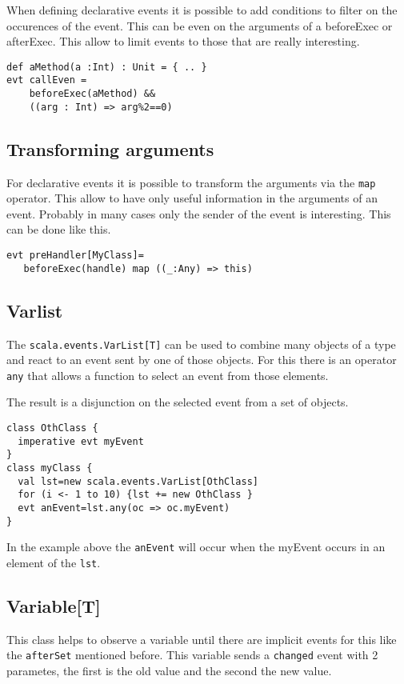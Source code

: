 \documentclass{article}
\begin{document}
When defining declarative events it is possible to add conditions
to filter on the occurences of the event. This can be even on the 
arguments of a beforeExec or afterExec. This allow to limit events 
to those that are really interesting.

\begin{lstlisting}
def aMethod(a :Int) : Unit = { .. }
evt callEven = 
    beforeExec(aMethod) && 
    ((arg : Int) => arg%2==0)
\end{lstlisting}

\subsection{Transforming arguments}
For declarative events it is possible to transform the arguments
via the {\tt map} operator. This allow to have only useful information
in the arguments of an event. Probably in many cases only the sender of
the event is interesting. This can be done like this.

\begin{lstlisting}
evt preHandler[MyClass]=
   beforeExec(handle) map ((_:Any) => this)
\end{lstlisting}

\subsection{Varlist}
The {\tt scala.events.VarList[T]} can be used to combine many objects
of a type and react to an event sent by one of those objects. For this 
there is an operator {\tt any} that allows a function to select an 
event from those elements.

The result is a disjunction on the selected event from a set of objects.

\begin{lstlisting}
class OthClass {
  imperative evt myEvent 
}
class myClass {
  val lst=new scala.events.VarList[OthClass]
  for (i <- 1 to 10) {lst += new OthClass }
  evt anEvent=lst.any(oc => oc.myEvent)
}
\end{lstlisting}

In the example above the {\tt anEvent} will occur when the myEvent
 occurs in an element of the {\tt lst}.


\subsection{Variable[T]}
This class helps to observe a variable until there are implicit events
for this like the {\tt afterSet} mentioned before. This variable sends 
a {\tt changed} event with 2 parametes, the first is the old value
and the second the new value.
\end{document}
